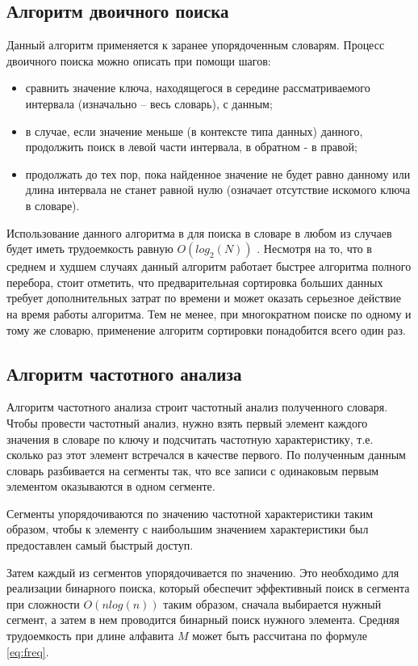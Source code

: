 \documentclass[12pt]{report}
\begin{document}
    \subsection{Алгоритм двоичного поиска}
    Данный алгоритм применяется к заранее упорядоченным словарям. Процесс двоичного поиска можно описать при помощи шагов:
    \begin{itemize}
    	\item сравнить значение ключа, находящегося в середине рассматриваемого интервала (изначально -- весь словарь), с данным;
    	\item в случае, если значение меньше (в контексте типа данных) данного, продолжить поиск в левой части интервала, в обратном - в правой;
    	\item продолжать до тех пор, пока найденное значение не будет равно данному или длина интервала не станет равной нулю (означает отсутствие искомого ключа в словаре).
    \end{itemize}
    Использование данного алгоритма в для поиска в словаре в любом из случаев будет иметь трудоемкость равную $O(log_2(N))$ \cite{2}. Несмотря на то, что в среднем и худшем случаях данный алгоритм работает быстрее алгоритма полного перебора, стоит отметить, что предварительная сортировка больших данных требует дополнительных затрат по времени и может оказать серьезное действие на время работы алгоритма. Тем не менее, при многократном поиске по одному и тому же словарю, применение алгоритм сортировки понадобится всего один раз.
    
    \subsection{Алгоритм частотного анализа}
    Алгоритм частотного анализа строит частотный анализ полученного словаря. Чтобы провести частотный анализ, нужно взять первый элемент каждого значения в словаре по ключу и подсчитать частотную характеристику, т.е. сколько раз этот элемент встречался в качестве первого. По полученным данным словарь разбивается на сегменты так, что все записи с одинаковым первым элементом оказываются в одном сегменте.
    
    Сегменты упорядочиваются по значению частотной характеристики таким образом, чтобы к элементу с наибольшим значением характеристики был предоставлен самый быстрый доступ.
    
    Затем каждый из сегментов упорядочивается по значению. Это необходимо для реализации бинарного поиска, который обеспечит эффективный поиск в сегмента при сложности $O(nlog(n))$ таким образом, сначала выбирается нужный сегмент, а затем в нем проводится бинарный поиск  нужного элемента. Средняя трудоемкость при длине алфавита $M$ может быть рассчитана по формуле \eqref{eq:freq}.
    
\end{document}
